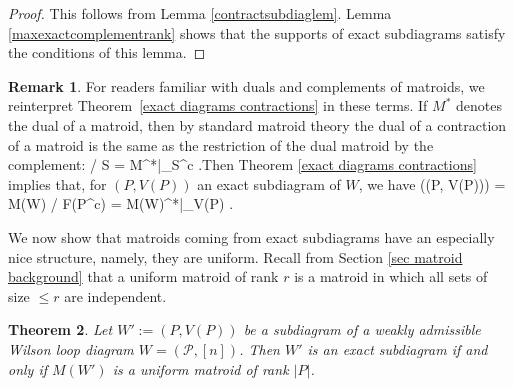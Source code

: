 \documentclass[11pt]{article}
\def\bas #1\eas{\begin{align*} #1 \end{align*}}
\newcommand{\cP}{\mathcal{P}}
\newtheorem{thm}{Theorem}[section]
\theoremstyle{remark}
\theoremstyle{definition}
\newtheorem{rmk}[thm]{Remark}
\begin{document}
\begin{proof}
This follows from Lemma \ref{contractsubdiaglem}. Lemma \ref{maxexactcomplementrank} shows that the supports of exact subdiagrams satisfy the conditions of this lemma.
\end{proof}

\begin{rmk} \label{remark exact dual restiction} For readers familiar with duals and complements of matroids, we reinterpret Theorem~\ref{exact diagrams contractions} in these terms. If $M^*$ denotes the dual of a matroid, then by standard matroid theory \cite{OxleyMatroidBook} the dual of a contraction of a matroid is the same as the restriction of the dual matroid by the complement: \bas M / S = M^*|_{S^c} \;.\eas Then Theorem \ref{exact diagrams contractions} implies that, for $(P, V(P))$ an exact subdiagram of $W$, we have \bas M\big((P, V(P))\big) = M(W)  / F(P^c) = M(W)^*|_{V(P)} \;.\eas
\end{rmk}

We now show that matroids coming from exact subdiagrams have an especially nice structure, namely, they are uniform. Recall from Section \ref{sec matroid background} that a uniform matroid of rank $r$ is a matroid in which all sets of size $ \leq r$ are independent.


\begin{thm} \label{exactuniformthm}
Let $W':= (P, V(P))$ be a subdiagram of a weakly admissible Wilson loop diagram $W= (\cP, [n])$. Then $W'$ is an exact subdiagram if and only if $M(W')$ is a uniform matroid of rank $|P|$.
\end{thm}
\end{document}
